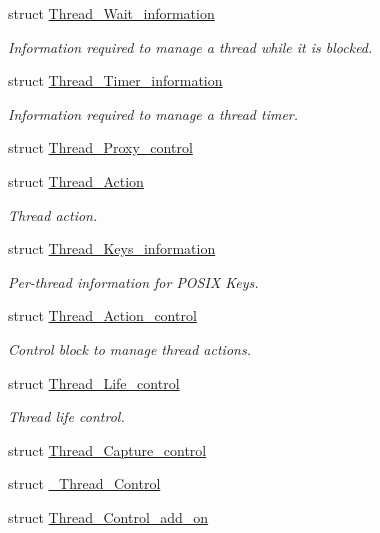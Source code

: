 \begin{DoxyCompactItemize}
struct \mbox{\hyperlink{structThread__Wait__information}{Thread\+\_\+\+Wait\+\_\+information}}
\begin{DoxyCompactList}\small\item\em Information required to manage a thread while it is blocked. \end{DoxyCompactList}\item 
struct \mbox{\hyperlink{structThread__Timer__information}{Thread\+\_\+\+Timer\+\_\+information}}
\begin{DoxyCompactList}\small\item\em Information required to manage a thread timer. \end{DoxyCompactList}\item 
struct \mbox{\hyperlink{structThread__Proxy__control}{Thread\+\_\+\+Proxy\+\_\+control}}
\item 
struct \mbox{\hyperlink{structThread__Action}{Thread\+\_\+\+Action}}
\begin{DoxyCompactList}\small\item\em Thread action. \end{DoxyCompactList}\item 
struct \mbox{\hyperlink{structThread__Keys__information}{Thread\+\_\+\+Keys\+\_\+information}}
\begin{DoxyCompactList}\small\item\em Per-\/thread information for P\+O\+S\+IX Keys. \end{DoxyCompactList}\item 
struct \mbox{\hyperlink{structThread__Action__control}{Thread\+\_\+\+Action\+\_\+control}}
\begin{DoxyCompactList}\small\item\em Control block to manage thread actions. \end{DoxyCompactList}\item 
struct \mbox{\hyperlink{structThread__Life__control}{Thread\+\_\+\+Life\+\_\+control}}
\begin{DoxyCompactList}\small\item\em Thread life control. \end{DoxyCompactList}\item 
struct \mbox{\hyperlink{structThread__Capture__control}{Thread\+\_\+\+Capture\+\_\+control}}
\item 
struct \mbox{\hyperlink{struct__Thread__Control}{\+\_\+\+Thread\+\_\+\+Control}}
\item 
struct \mbox{\hyperlink{structThread__Control__add__on}{Thread\+\_\+\+Control\+\_\+add\+\_\+on}}

\end{DoxyCompactItemize}
